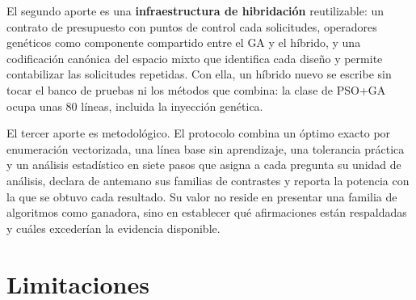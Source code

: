 El segundo aporte es una \textbf{infraestructura de hibridación} reutilizable: un contrato de presupuesto con puntos de control cada \Population{} solicitudes, operadores genéticos como componente compartido entre el GA y el híbrido, y una codificación canónica del espacio mixto que identifica cada diseño y permite contabilizar las solicitudes repetidas. Con ella, un híbrido nuevo se escribe sin tocar el banco de pruebas ni los métodos que combina: la clase de PSO+GA ocupa unas 80 líneas, incluida la inyección genética.

El tercer aporte es metodológico. El protocolo combina un óptimo exacto por enumeración vectorizada, una línea base sin aprendizaje, una tolerancia práctica y un análisis estadístico en siete pasos que asigna a cada pregunta su unidad de análisis, declara de antemano sus familias de contrastes y reporta la potencia con la que se obtuvo cada resultado. Su valor no reside en presentar una familia de algoritmos como ganadora, sino en establecer qué afirmaciones están respaldadas y cuáles excederían la evidencia disponible.

\section{Limitaciones}
\label{sec:limitaciones}

